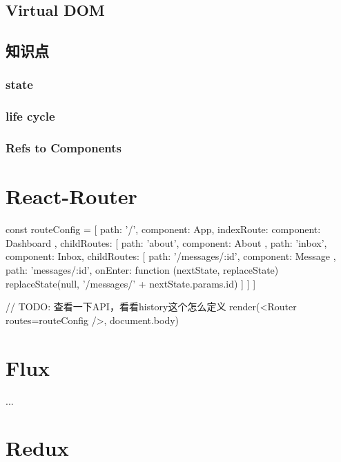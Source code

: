 \subsection{Virtual DOM}


\subsection{知识点}

\subsubsection{state}

\subsubsection{life cycle}

\subsubsection{Refs to Components}


\section{React-Router}

\begin{JavaScript}[目前使用的配置方案]

const routeConfig = [
  { path: '/',
    component: App,
    indexRoute: { component: Dashboard },
    childRoutes: [
      { path: 'about', component: About },
      { path: 'inbox',
        component: Inbox,
        childRoutes: [
          { path: '/messages/:id', component: Message },
          { path: 'messages/:id',
            onEnter: function (nextState, replaceState) {
              replaceState(null, '/messages/' + nextState.params.id)
            }
          }
        ]
      }
    ]
  }
]

// TODO: 查看一下API，看看history这个怎么定义
render(<Router routes={routeConfig} />, document.body)

\end{JavaScript}

\section{Flux}
...

\section{Redux}

